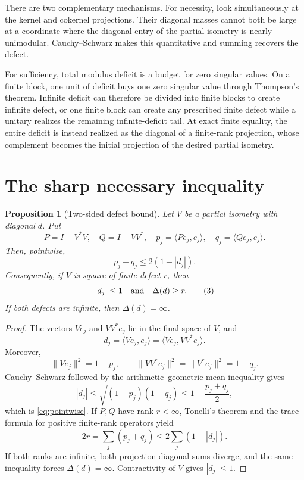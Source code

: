 \documentclass[11pt]{article}
\newtheorem{proposition}{Proposition}
\begin{document}
There are two complementary mechanisms.  For necessity, look simultaneously
at the kernel and cokernel projections.  Their diagonal masses cannot both be
large at a coordinate where the diagonal entry of the partial isometry is
nearly unimodular.  Cauchy--Schwarz makes this quantitative and summing recovers
the defect.

For sufficiency, total modulus deficit is a budget for zero singular values.
On a finite block, one unit of deficit buys one zero singular value through
Thompson's theorem.  Infinite deficit can therefore be divided into finite
blocks to create infinite defect, or one finite block can create any prescribed
finite defect while a unitary realizes the remaining infinite-deficit tail.
At exact finite equality, the entire deficit is instead realized as the
diagonal of a finite-rank projection, whose complement becomes the initial
projection of the desired partial isometry.

\section{The sharp necessary inequality}

\begin{proposition}[Two-sided defect bound]\label{prop:necessary}
Let $V$ be a partial isometry with diagonal $d$.  Put
\[
 P=I-V^*V,\quad Q=I-VV^*,\quad
 p_j=\langle Pe_j,e_j\rangle,\quad
 q_j=\langle Qe_j,e_j\rangle.
\]
Then, pointwise,
\[
 p_j+q_j\le 2(1-|d_j|).                                      \tag{2}\label{eq:pointwise}
\]
Consequently, if $V$ is square of finite defect $r$, then
\[
 |d_j|\le1\quad\hbox{and}\quad \Delta(d)\ge r.              \tag{3}\label{eq:necessary}
\]
If both defects are infinite, then $\Delta(d)=\infty$.
\end{proposition}

\begin{proof}
The vectors $Ve_j$ and $VV^*e_j$ lie in the final space of $V$, and
\[
 d_j=\langle Ve_j,e_j\rangle
     =\langle Ve_j,VV^*e_j\rangle.
\]
Moreover,
\[
 \|Ve_j\|^2=1-p_j,
 \qquad
 \|VV^*e_j\|^2=\|V^*e_j\|^2=1-q_j.
\]
Cauchy--Schwarz followed by the arithmetic--geometric mean inequality gives
\[
 |d_j|
 \le\sqrt{(1-p_j)(1-q_j)}
 \le 1-\frac{p_j+q_j}{2},
\]
which is \eqref{eq:pointwise}.  If $P,Q$ have rank $r<\infty$, Tonelli's
theorem and the trace formula for positive finite-rank operators yield
\[
 2r=\sum_j(p_j+q_j)
 \le 2\sum_j(1-|d_j|).
\]
If both ranks are infinite, both projection-diagonal sums diverge, and the
same inequality forces $\Delta(d)=\infty$.  Contractivity of $V$ gives
$|d_j|\le1$.
\end{proof}
\end{document}
